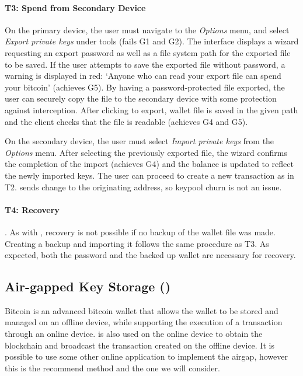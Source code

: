 \paragraph{T3: Spend from Secondary Device} On the primary device, the user must navigate to the \emph{Options} menu, and select \emph{Export private keys} under tools (fails G1 and G2). The interface displays a wizard requesting an export password as well as a file system path for the exported file to be saved. 
If the user attempts to save the exported file without password, a warning is displayed in red: `Anyone who can read your export file can spend your bitcoin' (achieves G5). By having a password-protected file exported, the user can securely copy the file to the secondary device with some protection against interception. After clicking to export, wallet file is saved in the given path and the client checks that the file is readable (achieves G4 and G5). 

On the secondary device, the user must select \emph{Import private keys} from the \emph{Options} menu. After selecting the previously exported file, the wizard confirms the completion of the import (achieves G4) and the balance is updated to reflect the newly imported keys. The user can proceed to create a new transaction as in T2. \multibit sends change to the originating address, so keypool churn is not an issue.


\paragraph{T4: Recovery}.
As with \bitcoinclient, recovery is not possible if no backup of the wallet file was made. Creating a backup and importing it follows the same procedure as T3. As expected, both the password and the backed up wallet are necessary for recovery.

\subsection{Air-gapped Key Storage (\armory)}
\label{air gap}
Bitcoin \armory is an advanced bitcoin wallet that allows the wallet to be stored and managed on an offline device, while supporting the execution of a transaction through an online device. \armory is also used on the online device to obtain the blockchain and broadcast the transaction created on the offline device. It is possible to use some other online application to implement the airgap, however this is the recommend method and the one we will consider.

